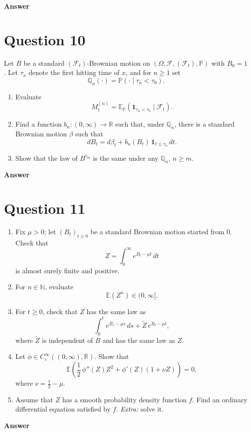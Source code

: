 \documentclass[letterpaper]{article}
\begin{document}
		\textbf{Answer}
		
		\clearpage
		
		\section{Question 10}
		
		Let $B$ be a standard $(\mathcal{F}_t)$-Brownian motion on
		$(\Omega,\mathcal{F},(\mathcal{F}_t),\mathbb{P})$ with $B_0=1$.
		Let $\tau_x$ denote the first hitting time of $x$, and for $n \ge 1$ set
		$$
		\mathbb{Q}_n(\cdot)=\mathbb{P}(\cdot \mid \tau_n<\tau_0).
		$$
		
		\begin{enumerate}
			\item[a.] Evaluate
			$$
			M_t^{(n)}=\mathbb{E}_{\mathbb{P}}\!\left(\mathbf{1}_{\tau_n<\tau_0}\mid \mathcal{F}_t\right).
			$$
			
			\item[b.] Find a function $b_n:(0,\infty)\to\mathbb{R}$ such that,
			under $\mathbb{Q}_n$, there is a standard Brownian motion $\beta$ such that
			$$
			dB_t = d\beta_t + b_n(B_t)\,\mathbf{1}_{t\le \tau_n}\,dt.
			$$
			
			\item[c.] Show that the law of $B^{\tau_m}$ is the same under any
			$\mathbb{Q}_n$, $n \ge m$.
		\end{enumerate}
		
		\textbf{Answer}
		
		\clearpage
		
		\section{Question 11}
		\begin{enumerate}
			\item[a.] Fix $\mu>0$; let $\left(B_t\right)_{t\ge 0}$ be a standard Brownian motion started from $0$.
			Check that
			\[
			Z=\int_0^{\infty} e^{B_t-\mu t}\,dt
			\]
			is almost surely finite and positive.
			
			\item[b.] For $n\in\mathbb{N}$, evaluate
			\[
			\mathbb{E}\left(Z^n\right)\in(0,\infty].
			\]
			
			\item[c.] For $t\ge0$, check that $Z$ has the same law as
			\[
			\int_0^t e^{B_s-\mu s}\,ds+\tilde Z\,e^{B_t-\mu t},
			\]
			where $\tilde Z$ is independent of $B$ and has the same law as $Z$.
			
			\item[d.] Let $\phi\in C_c^\infty((0,\infty),\mathbb{R})$. Show that
			\[
			\mathbb{E}\!\left(\frac12\,\phi''(Z)Z^2+\phi'(Z)(1+\nu Z)\right)=0,
			\]
			where $\nu=\frac12-\mu$.
			
			\item[e.] Assume that $Z$ has a smooth probability density function $f$.
			Find an ordinary differential equation satisfied by $f$.
			\textit{Extra:} solve it.
		\end{enumerate}
		\textbf{Answer}
		
\end{document}
